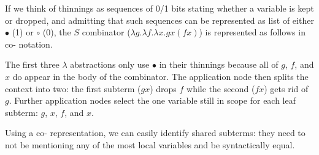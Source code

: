 If we think of thinnings as sequences of 0/1 bits stating whether a variable
is kept or dropped, and admitting that such sequences can be represented as
list of either $\bullet$ (1) or $\circ$ (0), the $S$ combinator
($\lambda g. \lambda f. \lambda x. g x (f x)$) is represented as follows in
co-\DeBruijn{} notation.

\begin{center}
  \codebruijnexamplegraph{}
\end{center}

The first three $\lambda$ abstractions only use $\bullet$ in their thinnings
because all of $g$, $f$, and $x$ do appear in the body of the combinator.
%
The application node then splits the context into two: the first subterm
($g x$) drops $f$ while the second ($f x$) gets rid of $g$.
%
Further application nodes select the one variable still in scope for each
leaf subterm: $g$, $x$, $f$, and $x$.


Using a co-\DeBruijn{} representation, we can easily identify shared subterms:
they need to not be mentioning any of the most local variables and be
syntactically equal.
